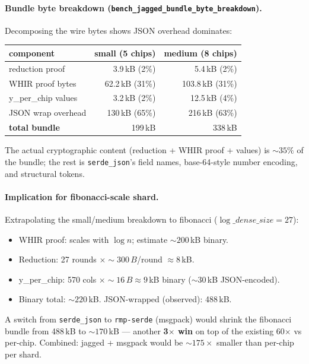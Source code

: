 \paragraph{Bundle byte breakdown
(\texttt{bench\_jagged\_bundle\_byte\_breakdown}).}
Decomposing the wire bytes shows JSON overhead dominates:

\begin{tabular}{lrr}
\toprule
\textbf{component}        & \textbf{small (5 chips)} & \textbf{medium (8 chips)} \\
\midrule
reduction proof           &   3.9\,kB  (2\%)         &   5.4\,kB  (2\%)  \\
WHIR proof bytes          &  62.2\,kB (31\%)         & 103.8\,kB (31\%)  \\
y\_per\_chip values       &   3.2\,kB  (2\%)         &  12.5\,kB  (4\%)  \\
JSON wrap overhead        & 130\,kB   (65\%)         & 216\,kB   (63\%)  \\
\midrule
\textbf{total bundle}     & 199\,kB                  & 338\,kB           \\
\bottomrule
\end{tabular}

The actual cryptographic content (reduction + WHIR proof + values) is
$\sim 35\%$ of the bundle; the rest is \texttt{serde\_json}'s field
names, base-64-style number encoding, and structural tokens.

\paragraph{Implication for fibonacci-scale shard.}
Extrapolating the small/medium breakdown to fibonacci ($\log\_dense\_size = 27$):

\begin{itemize}
  \item WHIR proof: scales with $\log n$; estimate $\sim 200$\,kB binary.
  \item Reduction: 27 rounds $\times \sim 300\,B$/round $\approx 8$\,kB.
  \item y\_per\_chip: 570 cols $\times \sim 16\,B \approx 9$\,kB binary
        ($\sim 30$\,kB JSON-encoded).
  \item Binary total: $\sim 220$\,kB.  JSON-wrapped (observed): 488\,kB.
\end{itemize}

A switch from \texttt{serde\_json} to \texttt{rmp-serde} (msgpack)
would shrink the fibonacci bundle from 488\,kB to $\sim 170$\,kB ---
another \textbf{3$\times$ win} on top of the existing 60$\times$ vs
per-chip.  Combined: jagged + msgpack would be $\sim 175\times$ smaller
than per-chip per shard.

